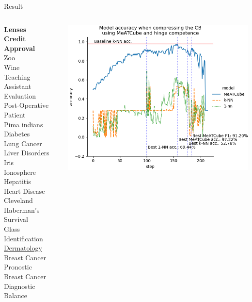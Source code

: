 \documentclass[]{beamer}
\begin{document}
\begin{frame}{Result}
    \begin{columns}
        \begin{column}{.35\textwidth}
            {\smaller\smaller
            \textbf{Lenses} \\
            \textbf{Credit Approval} \\
            Zoo \\
            Wine \\
            Teaching Assistant Evaluation \\
            Post-Operative Patient \\
            Pima indians Diabetes \\
            Lung Cancer \\
            Liver Disorders \\
            Iris \\
            Ionosphere \\
            Hepatitis \\
            Heart Disease Cleveland \\
            Haberman's Survival \\
            Glass Identification \\
            \underline{Dermatology} \\
            Breast Cancer Pronostic \\
            Breast Cancer Diagnostic \\
            Balance\\
            ~}
        \end{column}
        \begin{column}{.65\textwidth}
            \includegraphics[width=.8\textwidth]{../results/figs/dermatology.png}

\end{column}
\end{columns}
\end{frame}
\end{document}
